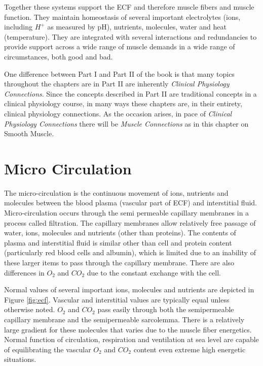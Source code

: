 Together these systems support the ECF and therefore muscle fibers and muscle function. They maintain homeostasis of several important electrolytes (ions, including $H^+$ as measured by pH), nutrients, molecules, water and heat (temperature). They are integrated with several interactions and redundancies to provide support across a wide range of muscle demands in a wide range of circumstances, both good and bad.

One difference between Part I and Part II of the book is that many topics throughout the chapters are in Part II are inherently \textit{Clinical Physiology Connections}. Since the concepts described in Part II are traditional concepts in a clinical physiology course, in many ways these chapters are, in their entirety, clinical physiology connections. As the occasion arises, in pace of \textit{Clinical Physiology Connections} there will be \textit{Muscle Connections} as in this chapter on Smooth Muscle.

\section{Micro Circulation}

The micro-circulation is the continuous movement of ions, nutrients and molecules between the blood plasma (vascular part of ECF) and interstitial fluid. Micro-circulation occurs through the semi permeable capillary membranes in a process called filtration. The capillary membranes allow relatively free passage of water, ions, molecules and  nutrients (other than proteins). The contents of plasma and interstitial fluid is similar other than cell and protein content (particularly red blood cells and albumin), which is limited due to an inability of these larger items to pass through the capillary membrane. There are also differences in $O_2$ and $CO_2$ due to the constant exchange with the cell.

Normal values of several important ions, molecules and nutrients are depicted in Figure \ref{fig:ecf}. Vascular and interstitial values are typically equal unless otherwise noted. $O_2$ and $CO_2$ pass easily through both the semipermeable capillary membrane and the semipermeable sarcolemma. There is a relatively large gradient for these molecules that varies due to the muscle fiber energetics. Normal function of circulation, respiration and ventilation at sea level are capable of equilibrating the vascular $O_2$ and $CO_2$ content even extreme high energetic situations.

